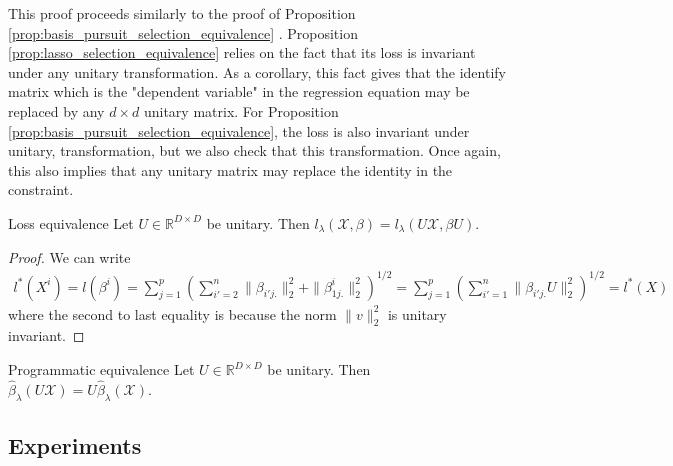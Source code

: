 This proof proceeds similarly to the proof of Proposition  \ref{prop:basis_pursuit_selection_equivalence} .
Proposition \ref{prop:lasso_selection_equivalence} relies on the fact that its loss is invariant under any unitary transformation.
As a corollary, this fact gives that the identify matrix which is the "dependent variable" in the regression equation may be replaced by any $d \times d$ unitary matrix.
For Proposition \ref{prop:basis_pursuit_selection_equivalence}, the loss is also invariant under unitary, transformation, but we also check that this transformation.
Once again, this also implies that any unitary matrix may replace the identity in the constraint.

 \begin{proposition}{Loss equivalence}
 \label{prop:lasso_loss_equivalence}
 Let $U \in \mathbb R^{D \times D}$ be unitary.
 Then $l_\lambda (\mathcal X, \beta) = l_\lambda (U \mathcal X, \beta U)$.
\end{proposition}

\begin{proof}
We can write 
\begin{eqnarray}
l^*(X^i) = l(\beta^i) = \sum_{j = 1}^p (\sum_{i'=2}^n \| \beta_{i'j.} \|_2^2 +  \|  \beta_{1j.}^i \|_2^2 )^{1/2}=  \sum_{j = 1}^p (\sum_{i'=1}^n \| \beta_{i'j.} U \|_2^2)^{1/2} = l^*(X)
\end{eqnarray}
where the second to last equality is because the norm $\|v\|_2^2 $ is unitary invariant.

\end{proof}

\begin{proposition}{Programmatic equivalence}
\label{prop:lasso_program_equivalence}
 Let $U \in \mathbb R^{D \times D}$ be unitary.
 Then $\hat \beta_{\lambda}  (U \mathcal X) = U\hat \beta_{\lambda} (\mathcal X)$.
\end{proposition}



\subsection{Experiments}


